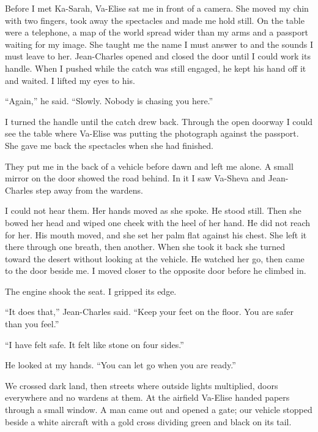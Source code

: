 Before I met Ka-Sarah, Va-Elise sat me in front of a camera. She moved my chin with two fingers, took away the spectacles and made me hold still. On the table were a telephone, a map of the world spread wider than my arms and a passport waiting for my image. She taught me the name I must answer to and the sounds I must leave to her. Jean-Charles opened and closed the door until I could work its handle. When I pushed while the catch was still engaged, he kept his hand off it and waited. I lifted my eyes to his.\par

``Again,'' he said. ``Slowly. Nobody is chasing you here.''\par

I turned the handle until the catch drew back. Through the open doorway I could see the table where Va-Elise was putting the photograph against the passport. She gave me back the spectacles when she had finished.\par

They put me in the back of a vehicle before dawn and left me alone. A small mirror on the door showed the road behind. In it I saw Va-Sheva and Jean-Charles step away from the wardens.\par

I could not hear them. Her hands moved as she spoke. He stood still. Then she bowed her head and wiped one cheek with the heel of her hand. He did not reach for her. His mouth moved, and she set her palm flat against his chest. She left it there through one breath, then another. When she took it back she turned toward the desert without looking at the vehicle. He watched her go, then came to the door beside me. I moved closer to the opposite door before he climbed in.\par

The engine shook the seat. I gripped its edge.\par

``It does that,'' Jean-Charles said. ``Keep your feet on the floor. You are safer than you feel.''\par

``I have felt safe. It felt like stone on four sides.''\par

He looked at my hands. ``You can let go when you are ready.''\par

We crossed dark land, then streets where outside lights multiplied, doors everywhere and no wardens at them. At the airfield Va-Elise handed papers through a small window. A man came out and opened a gate; our vehicle stopped beside a white aircraft with a gold cross dividing green and black on its tail.\par

